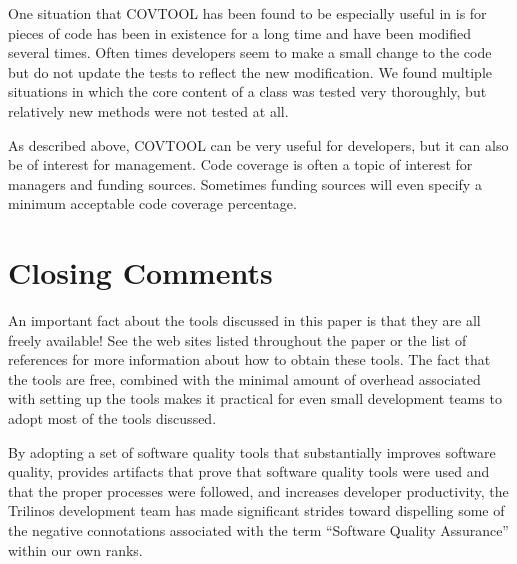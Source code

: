 \documentclass[12pt,relax]{article}
\begin{document}
One situation that COVTOOL has been found to be especially useful in is for 
pieces of code has been in existence for a long time and have been modified 
several times.  Often times developers seem to make a small change to the code 
but do not update the tests to reflect the new modification.  We found 
multiple situations in which the core content of a class was tested very 
thoroughly, but relatively new methods were not tested at all.

As described above, COVTOOL can be very useful for developers, but it can also
be of interest for management.  Code coverage is often a topic of interest for 
managers and funding sources.  Sometimes funding sources will even specify a 
minimum acceptable code coverage percentage.

\section{Closing Comments}

An important fact about the tools discussed in this paper is that they are all 
freely available!  See the web sites listed throughout the paper or the list 
of references for more information about how to obtain these tools.  The fact 
that the tools are free, combined with the minimal amount of overhead 
associated with setting up the tools makes it practical for even small 
development teams to adopt most of the tools discussed.  

By adopting a set of software quality tools that substantially improves
software quality, provides artifacts that prove that software quality tools 
were used and that the proper processes were followed, and increases developer
productivity, the Trilinos development team has made significant strides 
toward dispelling some of the negative connotations associated with the term
``Software Quality Assurance'' within our own ranks.

\clearpage

%

\end{document}

